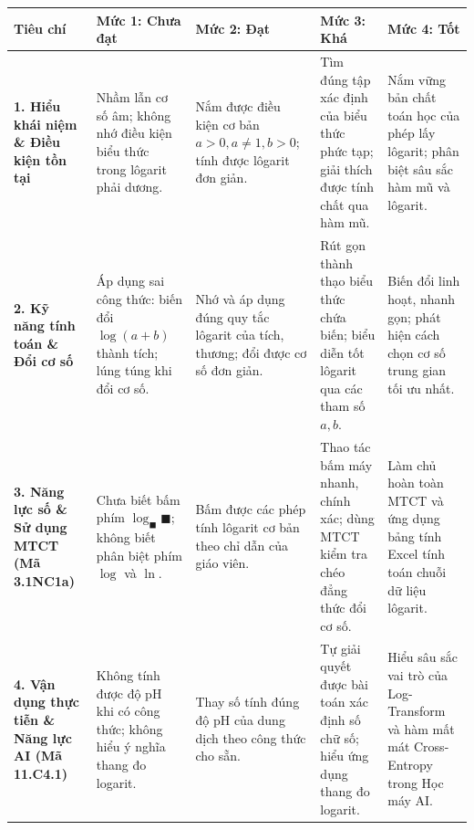 \documentclass[12pt, a4paper]{article}
\begin{document}
\begin{center}
\begin{tabularx}{\textwidth}{|p{2.8cm}|X|X|X|X|}
    \hline
    \textbf{Tiêu chí} & \textbf{Mức 1: Chưa đạt} & \textbf{Mức 2: Đạt} & \textbf{Mức 3: Khá} & \textbf{Mức 4: Tốt} \\ \hline
    \textbf{1. Hiểu khái niệm \& Điều kiện tồn tại} & Nhầm lẫn cơ số âm; không nhớ điều kiện biểu thức trong lôgarit phải dương. & Nắm được điều kiện cơ bản $a > 0, a \neq 1, b > 0$; tính được lôgarit đơn giản. & Tìm đúng tập xác định của biểu thức phức tạp; giải thích được tính chất qua hàm mũ. & Nắm vững bản chất toán học của phép lấy lôgarit; phân biệt sâu sắc hàm mũ và lôgarit. \\ \hline
    \textbf{2. Kỹ năng tính toán \& Đổi cơ số} & Áp dụng sai công thức: biến đổi $\log(a+b)$ thành tích; lúng túng khi đổi cơ số. & Nhớ và áp dụng đúng quy tắc lôgarit của tích, thương; đổi được cơ số đơn giản. & Rút gọn thành thạo biểu thức chứa biến; biểu diễn tốt lôgarit qua các tham số $a, b$. & Biến đổi linh hoạt, nhanh gọn; phát hiện cách chọn cơ số trung gian tối ưu nhất. \\ \hline
    \textbf{3. Năng lực số \& Sử dụng MTCT (Mã 3.1NC1a)} & Chưa biết bấm phím $\log_\blacksquare\blacksquare$; không biết phân biệt phím $\log$ và $\ln$. & Bấm được các phép tính lôgarit cơ bản theo chỉ dẫn của giáo viên. & Thao tác bấm máy nhanh, chính xác; dùng MTCT kiểm tra chéo đẳng thức đổi cơ số. & Làm chủ hoàn toàn MTCT và ứng dụng bảng tính Excel tính toán chuỗi dữ liệu lôgarit. \\ \hline
    \textbf{4. Vận dụng thực tiễn \& Năng lực AI (Mã 11.C4.1)} & Không tính được độ pH khi có công thức; không hiểu ý nghĩa thang đo logarit. & Thay số tính đúng độ pH của dung dịch theo công thức cho sẵn. & Tự giải quyết được bài toán xác định số chữ số; hiểu ứng dụng thang đo logarit. & Hiểu sâu sắc vai trò của Log-Transform và hàm mất mát Cross-Entropy trong Học máy AI. \\ \hline
\end{tabularx}
\end{center}
\end{document}
